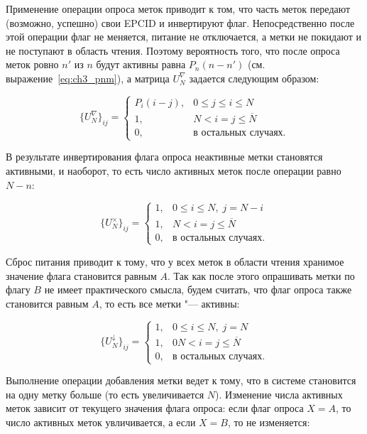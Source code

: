 Применение операции опроса меток приводит к том, что часть меток передают (возможно, успешно) свои EPCID и инвертируют флаг. Непосредственно после этой операции флаг не меняется, питание не отключается, а метки не покидают и не поступают в область чтения. Поэтому вероятность того, что после опроса меток ровно $n'$ из $n$ будут активны равна $P_n(n - n')$ (см. выражение~\eqref{eq:ch3_pnm}), а матрица $U_N^\nabla$ задается следующим образом:

\begin{equation}\label{eq:ch3_bg_inventory}
	\{ U_N^\nabla \}_{ij} = \begin{cases}
		P_i(i - j), & 0 \leqslant j \leqslant i \leqslant N\\
		1,          & N < i = j \leqslant \overline{N}\\
		0,          & \text{в остальных случаях.}
 	\end{cases}
\end{equation}

В результате инвертирования флага опроса неактивные метки становятся активными, и наоборот, то есть число активных меток после операции равно $N - n$:

\begin{equation}\label{eq:ch3_bg_switch}
	\{ U_N^\times \}_{ij} = \begin{cases}
 		1, & 0 \leqslant i \leqslant N,\; j = N - i\\
 		1, & N < i = j \leqslant \overline{N}\\
 		0, & \text{в остальных случаях.}
 	\end{cases}
\end{equation}

Сброс питания приводит к тому, что у всех меток в области чтения хранимое значение флага становится равным $A$. Так как после этого опрашивать метки по флагу $B$ не имеет практического смысла, будем считать, что флаг опроса также становится равным $A$, то есть все метки "--- активны:

\begin{equation}\label{eq:ch3_bg_power_off}
	\{ U_N^\downarrow \}_{ij} = \begin{cases}
 		1, & 0 \leqslant i \leqslant N,\; j = N\\
 		1, & 0 N < i = j \leqslant \overline{N}\\
 		0, & \text{в остальных случаях.}
 	\end{cases}
\end{equation}

Выполнение операции добавления метки ведет к тому, что в системе становится на одну метку больше (то есть увеличивается $N$). Изменение числа активных меток зависит от текущего значения флага опроса: если флаг опроса $X = A$, то число активных меток увличивается, а если $X = B$, то не изменяется:

